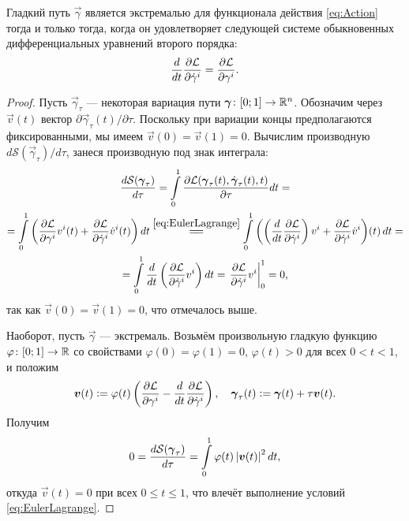 \begin{lemma}
	Гладкий путь $\vec{\gamma}$ является экстремалью для функционала действия \eqref{eq:Action} тогда и только тогда, когда он удовлетворяет следующей системе обыкновенных дифференциальных уравнений второго порядка:
	\begin{equation} \label{eq:EulerLagrange}
		\frac{d}{dt}\frac{\partial\mathcal{L}}{\partial\dot{\gamma}^i} = \frac{\partial\mathcal{L}}{\partial\gamma^i}.
	\end{equation}
\end{lemma}

\begin{proof}
	Пусть $\vec{\gamma}_\tau$ --- некоторая вариация пути $\vec{\gamma}\colon [0; 1] \hm\to \R^n$. Обозначим через $\vec{v}(t)$ вектор $\partial\vec{\gamma}_\tau(t) / \partial\tau$. Поскольку при вариации концы предполагаются фиксированными, мы имеем $\vec{v}(0) = \vec{v}(1) = 0$. Вычислим производную $d\mathcal{S}(\vec{\gamma}_\tau) / d\tau$, занеся производную под знак интеграла:
	\begin{multline*}
		\frac{d\mathcal{S}(\vec{\gamma}_\tau)}{d\tau} = \int\limits_0^1\frac{\partial\L(\vec{\gamma}_\tau(t), \dot{\vec{\gamma}}_\tau(t), t)}{\partial\tau}dt =\\ = \int\limits_0^1\br{\frac{\partial\L}{\partial\gamma^i}v^i(t) + \frac{\partial\L}{\partial\dot{\gamma}^i}\dot{v}^i(t)}dt \stackrel{\eqref{eq:EulerLagrange}}{=\joinrel=} \int\limits_0^1\br{\br{\frac{d}{dt}\frac{\partial\L}{\partial\dot{\gamma}^i}}v^i + \frac{\partial\L}{\partial\dot{\gamma}^i}\dot{v}^i}\!(t)\,dt =\\ = \int\limits_0^1\frac{d}{dt}\br{\frac{\partial\L}{\partial\dot{\gamma}^i}v^i}dt = \left.\frac{\partial\L}{\partial\dot{\gamma}^i}v^i\right|_0^1 = 0,
	\end{multline*}
	так как $\vec{v}(0) = \vec{v}(1) = 0$, что отмечалось выше.

	Наоборот, пусть $\vec{\gamma}$ --- экстремаль. Возьмём произвольную гладкую функцию $\varphi\colon [0; 1] \to \mathbb{R}$ со свойствами $\varphi(0) = \varphi(1) = 0$, $\varphi(t) > 0$ для всех $0 < t < 1$, и положим
	\[
		\boldsymbol{v}(t) \vcentcolon = \varphi(t)\left(\frac{\partial\mathcal{L}}{\partial\gamma^i} - \frac{d}{dt}\frac{\partial\mathcal{L}}{\partial\dot{\gamma}^i}\right),\quad \boldsymbol{\gamma}_\tau(t) \vcentcolon = \boldsymbol{\gamma}(t) + \tau\boldsymbol{v}(t).
	\]
	Получим
	\[
		0 = \frac{d\mathcal{S}(\boldsymbol{\gamma}_\tau)}{d\tau} = \int\limits_0^1\varphi(t)\left\lvert\boldsymbol{v}(t)\right\rvert^2dt,
	\]
	откуда $\vec{v}(t) = 0$ при всех $0 \leqslant t \leqslant 1$, что влечёт выполнение условий \eqref{eq:EulerLagrange}.
\end{proof}

